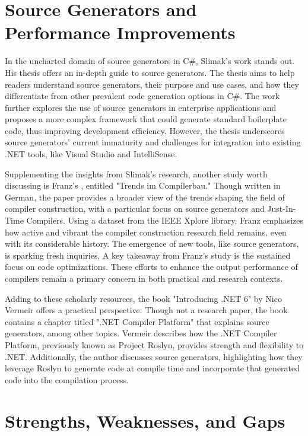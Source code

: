 \section{Source Generators and Performance Improvements}

In the uncharted domain of source generators in C\#, Slimak's work \cite{Slimak2022} stands out. His thesis offers an in-depth guide to source generators. The thesis aims to help readers understand source generators, their purpose and use cases, and how they differentiate from other prevalent code generation options in C\#. The work further explores the use of source generators in enterprise applications and proposes a more complex framework that could generate standard boilerplate code, thus improving development efficiency. However, the thesis underscores source generators' current immaturity and challenges for integration into existing .NET tools, like Visual Studio and IntelliSense.

Supplementing the insights from Slimak's research, another study worth discussing is Franz's \cite{Franz2022}, entitled "Trends im Compilerbau." Though written in German, the paper provides a broader view of the trends shaping the field of compiler construction, with a particular focus on source generators and Just-In-Time Compilers. Using a dataset from the IEEE Xplore library, Franz emphasizes how active and vibrant the compiler construction research field remains, even with its considerable history. The emergence of new tools, like source generators, is sparking fresh inquiries. A key takeaway from Franz's study is the sustained focus on code optimizations. These efforts to enhance the output performance of compilers remain a primary concern in both practical and research contexts.

Adding to these scholarly resources, the book "Introducing .NET 6" by Nico Vermeir \cite{Vermeir2022} offers a practical perspective. Though not a research paper, the book contains a chapter titled ".NET Compiler Platform" that explains source generators, among other topics. Vermeir describes how the .NET Compiler Platform, previously known as Project Roslyn, provides strength and flexibility to .NET. Additionally, the author discusses source generators, highlighting how they leverage Roslyn to generate code at compile time and incorporate that generated code into the compilation process.

\section{Strengths, Weaknesses, and Gaps}


